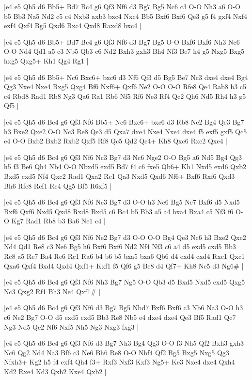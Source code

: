 \whitename{}
\blackname{}
\makegametitle
|e4 e5 Qh5 d6 Bb5+ Bd7 Bc4 g6 Qf3 Nf6 d3 Bg7 Bg5 Nc6 c3 O-O Nh3 a6 O-O b5 Bb3 Na5 Nd2 c5 c4 Nxb3 axb3 bxc4 Nxc4 Bb5 Bxf6 Bxf6 Qe3 g5 f4 gxf4 Nxf4 exf4 Qxf4 Bg5 Qxd6 Bxc4 Qxd8 Raxd8 bxc4  |

\whitename{}
\blackname{}
\makegametitle
|e4 e5 Qh5 d6 Bb5+ Bd7 Bc4 g6 Qf3 Nf6 d3 Bg7 Bg5 O-O Bxf6 Bxf6 Nh3 Nc6 O-O Nd4 Qd1 a5 c3 Nb5 Qb3 c6 Nd2 Bxh3 gxh3 Bh4 Nf3 Be7 h4 g5 Nxg5 Bxg5 hxg5 Qxg5+ Kh1 Qg4 Rg1  |

\whitename{}
\blackname{}
\makegametitle
|e4 e5 Qh5 d6 Bb5+ Nc6 Bxc6+ bxc6 d3 Nf6 Qf3 d5 Bg5 Be7 Nc3 dxe4 dxe4 Bg4 Qg3 Nxe4 Nxe4 Bxg5 Qxg4 Bf6 Nxf6+ Qxf6 Ne2 O-O O-O Rfe8 Qe4 Rab8 b3 c5 c4 Rbd8 Rad1 Rb8 Ng3 Qa6 Ra1 Rb6 Nf5 Rf6 Ne3 Rf4 Qc2 Qh6 Nd5 Rh4 h3 g5 Qf5  |

\whitename{}
\blackname{}
\makegametitle
|e4 e5 Qh5 d6 Bc4 g6 Qf3 Nf6 Bb5+ Nc6 Bxc6+ bxc6 d3 Rb8 Ne2 Bg4 Qe3 Bg7 h3 Bxe2 Qxe2 O-O Nc3 Re8 Qe3 d5 Qxa7 dxe4 Nxe4 Nxe4 dxe4 f5 exf5 gxf5 Qc5 e4 O-O Bxb2 Bxb2 Rxb2 Qxf5 Rf8 Qc5 Qd2 Qc4+ Kh8 Qxc6 Rxc2 Qxe4  |

\whitename{}
\blackname{}
\makegametitle
|e4 e5 Qh5 d6 Bc4 g6 Qf3 Nf6 Nc3 Bg7 d3 Nc6 Nge2 O-O Bg5 a6 Nd5 Bg4 Qg3 h5 f3 Be6 Qh4 Nb4 O-O Nbxd5 exd5 Bd7 f4 c6 fxe5 Qb6+ Kh1 Nxd5 exd6 Qxb2 Bxd5 cxd5 Nf4 Qxc2 Rad1 Qxa2 Rc1 Qa3 Nxd5 Qxd6 Nf6+ Bxf6 Rxf6 Qxd3 Bh6 Rfe8 Rcf1 Re4 Qg5 Bf5 R6xf5  |

\whitename{}
\blackname{}
\makegametitle
|e4 e5 Qh5 d6 Bc4 g6 Qf3 Nf6 Nc3 Bg7 d3 O-O h3 Nc6 Bg5 Ne7 Bxf6 d5 Nxd5 Bxf6 Qxf6 Nxd5 Qxd8 Rxd8 Bxd5 c6 Bc4 b5 Bb3 a5 a4 bxa4 Bxa4 c5 Nf3 f6 O-O Kg7 Rad1 Rb8 b3 Ba6 Ne1 c4  |

\whitename{}
\blackname{}
\makegametitle
|e4 e5 Qh5 d6 Bc4 g6 Qf3 Nf6 Ne2 Bg7 d3 O-O O-O Bg4 Qe3 Nc6 h3 Bxe2 Qxe2 Nd4 Qd1 Re8 c3 Ne6 Bg5 h6 Bxf6 Bxf6 Nd2 Nf4 Nf3 c6 a4 d5 exd5 cxd5 Bb3 Rc8 a5 Re7 Ba4 Re6 Rc1 Ra6 b4 b6 b5 bxa5 bxa6 Qb6 d4 exd4 cxd4 Rxc1 Qxc1 Qxa6 Qxf4 Bxd4 Qxd4 Qxf1+ Kxf1 f5 Qf6 g5 Be8 d4 Qf7+ Kh8 Ne5 d3 Ng6\#  |

\whitename{}
\blackname{}
\makegametitle
|e4 e5 Qh5 d6 Bc4 g6 Qf3 Nf6 Nh3 Bg7 Ng5 O-O Qb3 d5 Bxd5 Nxd5 exd5 Qxg5 Nc3 Qxg2 Rf1 Bh3 Ne4 Qxf1\#  |

\whitename{}
\blackname{}
\makegametitle
|e4 e5 Qh5 d6 Bc4 g6 Qf3 Nf6 d3 Bg7 Bg5 Nbd7 Bxf6 Bxf6 c3 Nb6 Na3 O-O h3 c6 Ne2 Bg7 O-O d5 exd5 cxd5 Bb3 Re8 Nb5 e4 dxe4 dxe4 Qe3 Bf5 Rad1 Qe7 Ng3 Nd5 Qe2 Nf6 Nxf5 Nh5 Ng3 Nxg3 fxg3  |

\whitename{}
\blackname{}
\makegametitle
|e4 e5 Qh5 d6 Bc4 g6 Qf3 Nf6 d3 Bg7 Nh3 Bg4 Qg3 O-O f3 Nh5 Qf2 Bxh3 gxh3 Nc6 Qg2 Nd4 Na3 Bf6 c3 Ne6 Bh6 Re8 O-O Nhf4 Qf2 Bg5 Bxg5 Nxg5 Qg3 Nfxh3+ Kg2 h5 f4 exf4 Qh4 f3+ Rxf3 Nxf3 Kxf3 Ng5+ Ke3 Nxe4 dxe4 Qxh4 Kd2 Rxe4 Kd3 Qxh2 Kxe4 Qxb2  |

